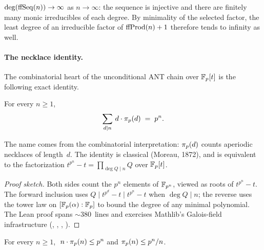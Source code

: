 \begin{lemma}
\label{lem:ff-seq-degree}
$\deg(\mathrm{ffSeq}(n)) \to \infty$ as $n \to \infty$: the sequence is injective
and there are finitely many monic irreducibles of each degree.  By
minimality of the selected factor, the least degree of an irreducible
factor of $\mathrm{ffProd}(n)+1$ therefore tends to infinity as well.
\end{lemma}

\paragraph{The necklace identity.}

The combinatorial heart of the unconditional ANT chain over $\mathbb{F}_p[t]$ is
the following exact identity.

\begin{theorem}
\label{thm:necklace}
For every $n \geq 1$,
\[
  \sum_{d \mid n}\, d\cdot\pi_p(d) \;=\; p^n.
\]
\end{theorem}

The name comes from the combinatorial interpretation: $\pi_p(d)$
counts aperiodic necklaces of length~$d$.  The identity is classical
(Moreau, 1872), and is equivalent to the factorization
$t^{p^n}-t = \prod_{\deg Q \mid n} Q$ over $\mathbb{F}_p[t]$.

\begin{proof}[Proof sketch]
Both sides count the $p^n$ elements of $\mathbb{F}_{p^{n}}$, viewed as roots of
$t^{p^n}-t$.  The forward inclusion uses
$Q \mid t^{p^d}-t \mid t^{p^n}-t$ when $\deg Q \mid n$; the reverse
uses the tower law on $[\mathbb{F}_p(\alpha):\mathbb{F}_p]$ to bound the degree of any
minimal polynomial.  The Lean proof spans ${\sim}380$~lines and
exercises Mathlib's Galois-field infrastructure
(, ,
,
).
\end{proof}

\begin{corollary}
\label{cor:irred-bounds}
For every $n \geq 1$, $\;n\cdot\pi_p(n) \leq p^n$ and
$\pi_p(n) \leq p^n/n$.
\end{corollary}

